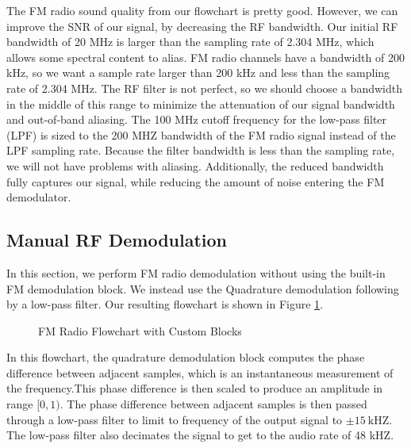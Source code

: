 \documentclass{article}
\begin{document}
The FM radio sound quality from our flowchart is pretty good. However, we can improve the SNR of our signal, by decreasing the RF bandwidth. Our initial RF bandwidth of 20 MHz is larger than the sampling rate of 2.304 MHz, which allows some spectral content to alias. FM radio channels have a bandwidth of 200 kHz, so we want a sample rate larger than 200 kHz and less than the sampling rate of 2.304 MHz. The RF filter is not perfect, so we should choose a bandwidth in the middle of this range to minimize the attenuation of our signal bandwidth and out-of-band aliasing. The 100 MHz cutoff frequency for the low-pass filter (LPF) is sized to the 200 MHZ bandwidth of the FM radio signal instead of the LPF sampling rate. Because the filter bandwidth is less than the sampling rate, we will not have problems with aliasing. Additionally, the reduced bandwidth fully captures our signal, while reducing the amount of noise entering the FM demodulator.

\subsection{Manual RF Demodulation}

In this section, we perform FM radio demodulation without using the built-in FM demodulation block. We instead use the Quadrature demodulation following by a low-pass filter. Our resulting flowchart is shown in Figure \ref{fig::fm_radio_user_flowchart}.

\begin{figure}[H]
	\centerline{}
	\caption{FM Radio Flowchart with Custom Blocks}
	\label{fig::fm_radio_user_flowchart}
\end{figure}

\noindent In this flowchart, the quadrature demodulation block computes the phase difference between adjacent samples, which is an instantaneous measurement of the frequency.This phase difference is then scaled to produce an amplitude in range $[0, 1)$. The phase difference between adjacent samples is then passed through a low-pass filter to limit to frequency of the output signal to $\pm 15\ \text{kHZ}$. The low-pass filter also decimates the signal to get to the audio rate of 48 kHZ.
\end{document}
